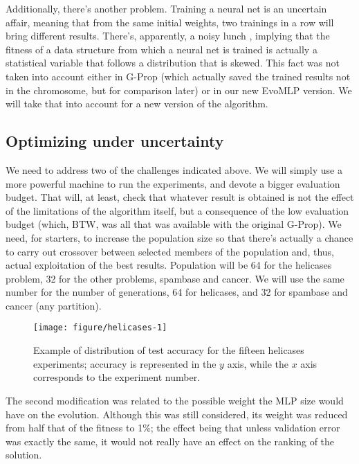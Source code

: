 \documentclass[conference]{IEEEtran}\usepackage[]{graphicx}\usepackage[]{color}
\makeatletter
\def\maxwidth{ %
  \ifdim\Gin@nat@width>\linewidth
    \linewidth
  \else
    \Gin@nat@width
  \fi
}
\newenvironment{knitrout}{}{} %
\makeatother
\begin{document}
Additionally, there's another problem. Training a neural net is an
uncertain affair, meaning that from the same initial weights, two
trainings in a row will bring different results. There's, apparently,
a noisy lunch \cite{DBLP:conf/ijcci/MereloLFGCCRMG15}, implying
that the fitness of a data structure from which a neural net is
trained is actually a statistical variable that follows a distribution
that is skewed. This fact was not taken into account either in G-Prop
(which actually saved the trained results not in the chromosome, but
for comparison later) or in our new EvoMLP version. We will take that
into account for a new version of the algorithm.

\subsection{Optimizing under uncertainty}

We need to address two of the challenges indicated above. We will
simply use a more powerful machine to run the experiments, and devote
a bigger evaluation budget. That will, at least, check that whatever
result is obtained is not the effect of the limitations of the
algorithm itself, but a consequence of the low evaluation budget
(which, BTW, was all that was available with the original G-Prop). We
need, for starters, to increase the population size so that there's
actually a chance to carry out crossover between selected members of
the population and, thus, actual exploitation of the best
results. Population will be 64 for the helicases problem, 32 for the
other problems, spambase and cancer. We will use the same number for
the number of generations, 64 for helicases, and 32 for spambase and
cancer (any partition).


\begin{figure}[h!tb]
  \centering
\begin{knitrout}
\color{fgcolor}
\texttt{[image: figure/helicases-1]} 

\end{knitrout}
\caption{Example of distribution of test accuracy for the fifteen helicases experiments; accuracy is represented in the $y$ axis, while the $x$ axis corresponds to the experiment number.}
  \label{fig:heli}
 \end{figure} 
The second modification was related to the possible weight the MLP
size would have on the evolution. Although this was still considered,
its weight was reduced from half that of the fitness to 1\%; the
effect being that unless validation error was exactly the same, it
would not really have an effect on the ranking of the solution.
 
\end{document}
